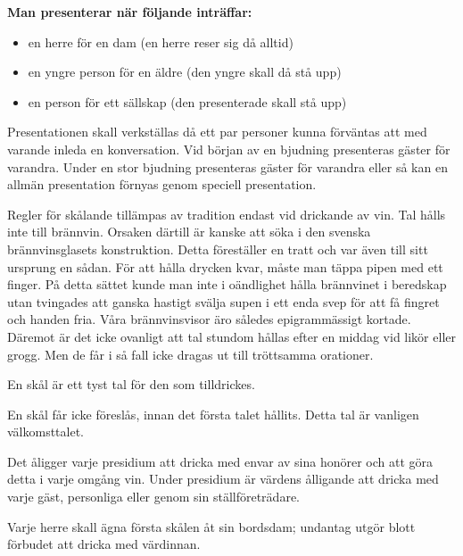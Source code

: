 \pagestyle{Hyfs och Etikett}


\textbf{Man presenterar när följande inträffar:}

\begin{itemize}
    \item en herre för en dam (en herre reser sig då alltid)
    \item en yngre person för en äldre (den yngre skall då stå upp)
    \item en person för ett sällskap (den presenterade skall stå upp)
\end{itemize}

Presentationen skall verkställas då ett par personer kunna förväntas att med varande inleda en konversation. Vid början av en bjudning presenteras gäster för varandra. Under en stor bjudning presenteras gäster för varandra eller så kan en allmän presentation förnyas genom speciell presentation.


Regler för skålande tillämpas av tradition endast vid drickande av vin. Tal hålls inte till brännvin. Orsaken därtill är kanske att söka i den svenska brännvinsglasets konstruktion. Detta föreställer en tratt och var även till sitt ursprung en sådan. För att hålla drycken kvar, måste man täppa pipen med ett finger. På detta sättet kunde man inte i oändlighet hålla brännvinet i beredskap utan tvingades att ganska hastigt svälja supen i ett enda svep för att få fingret och handen fria. Våra brännvinsvisor äro således epigrammässigt kortade. Däremot är det icke ovanligt att tal stundom hållas efter en middag vid likör eller grogg. Men de får i så fall icke dragas ut till tröttsamma orationer.

En skål är ett tyst tal för den som tilldrickes.

En skål får icke föreslås, innan det första talet hållits. Detta tal är vanligen välkomsttalet.

Det åligger varje presidium att dricka med envar av sina honörer och att göra detta i varje omgång vin. Under presidium är värdens ålligande att dricka med varje gäst, personliga eller genom sin ställföreträdare.

Varje herre skall ägna första skålen åt sin bordsdam; undantag utgör blott förbudet att dricka med värdinnan.

